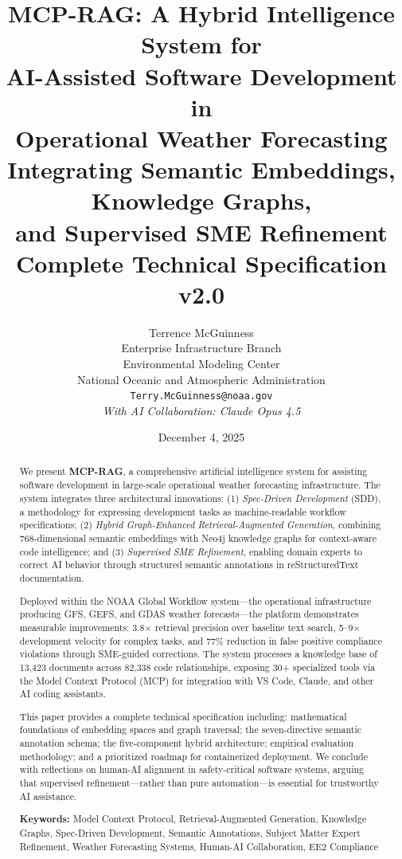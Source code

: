 \documentclass[11pt,letterpaper]{article}
\title{%
    \vspace{-1cm}
    \textbf{MCP-RAG: A Hybrid Intelligence System for\\
    AI-Assisted Software Development in\\
    Operational Weather Forecasting}\\[0.5cm]
    \large Integrating Semantic Embeddings, Knowledge Graphs,\\
    and Supervised SME Refinement\\[0.3cm]
    \normalsize Complete Technical Specification v2.0
}
\author{
    Terrence McGuinness\\
    Enterprise Infrastructure Branch\\
    Environmental Modeling Center\\
    National Oceanic and Atmospheric Administration\\
    \texttt{Terry.McGuinness@noaa.gov}\\[0.3cm]
    \textit{With AI Collaboration: Claude Opus 4.5}
}
\date{December 4, 2025}
\newcommand{\sdd}{\textsc{SDD}}
\newcommand{\mcp}{\textsc{MCP}}
\begin{document}
\maketitle

\begin{abstract}
We present \textbf{MCP-RAG}, a comprehensive artificial intelligence system for assisting software development in large-scale operational weather forecasting infrastructure. The system integrates three architectural innovations: (1) \textit{Spec-Driven Development} (\sdd{}), a methodology for expressing development tasks as machine-readable workflow specifications; (2) \textit{Hybrid Graph-Enhanced Retrieval-Augmented Generation}, combining 768-dimensional semantic embeddings with Neo4j knowledge graphs for context-aware code intelligence; and (3) \textit{Supervised SME Refinement}, enabling domain experts to correct AI behavior through structured semantic annotations in reStructuredText documentation.

Deployed within the NOAA Global Workflow system---the operational infrastructure producing GFS, GEFS, and GDAS weather forecasts---the platform demonstrates measurable improvements: 3.8$\times$ retrieval precision over baseline text search, 5--9$\times$ development velocity for complex tasks, and 77\% reduction in false positive compliance violations through SME-guided corrections. The system processes a knowledge base of 13,423 documents across 82,338 code relationships, exposing 30+ specialized tools via the Model Context Protocol (\mcp{}) for integration with VS Code, Claude, and other AI coding assistants.

This paper provides a complete technical specification including: mathematical foundations of embedding spaces and graph traversal; the seven-directive semantic annotation schema; the five-component hybrid architecture; empirical evaluation methodology; and a prioritized roadmap for containerized deployment. We conclude with reflections on human-AI alignment in safety-critical software systems, arguing that supervised refinement---rather than pure automation---is essential for trustworthy AI assistance.

\textbf{Keywords:} Model Context Protocol, Retrieval-Augmented Generation, Knowledge Graphs, Spec-Driven Development, Semantic Annotations, Subject Matter Expert Refinement, Weather Forecasting Systems, Human-AI Collaboration, EE2 Compliance
\end{abstract}

\tableofcontents
\newpage
\end{document}
